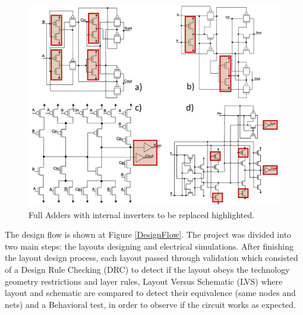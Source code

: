 \documentclass[pgmicro,mestrado,english]{iiufrgs}
\begin{document}
\begin{figure}[]
\centering
\includegraphics[width=1\textwidth]{FAs.png}
\caption{Full Adders with internal inverters to be replaced highlighted.}
\label{fig:FAs}
\end{figure}

The design flow is shown at Figure \ref{DesignFlow}. The project was divided into two main steps: the layouts designing and electrical simulations. After finishing the layout design process, each layout passed through validation which consisted of a Design Rule Checking (DRC) to detect if the layout obeys the technology geometry restrictions and layer rules, Layout Versus Schematic (LVS) where layout and schematic are compared to detect their equivalence (same nodes and nets) and a Behavioral test, in order to observe if the circuit works as expected.
\end{document}
